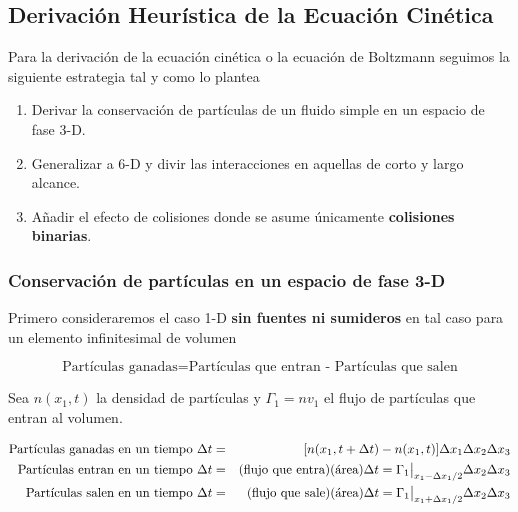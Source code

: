 \subsection{Derivaci\'on Heur\'istica de la Ecuaci\'on Cin\'etica}

Para la derivaci\'on de la ecuaci\'on cin\'etica o la ecuaci\'on de Boltzmann seguimos la siguiente estrategia tal y como lo plantea \cite{freidberg2014}

\begin{enumerate}
  \item Derivar la conservaci\'on de part\'iculas de un fluido simple en un espacio de fase 3-D.
  \item Generalizar a 6-D y divir las interacciones en aquellas de corto y largo alcance.
  \item A\~nadir el efecto de colisiones donde se asume \'unicamente \textbf{colisiones binarias}.
\end{enumerate} 

\subsubsection{Conservaci\'on de part\'iculas en un espacio de fase 3-D}

Primero consideraremos el caso 1-D \textbf{sin fuentes ni sumideros} en tal caso para un elemento infinitesimal de volumen 

\begin{equation*}
\text{Part\'iculas ganadas} = \text{Part\'iculas que entran - Part\'iculas que salen}
\end{equation*}

Sea $n(x_1, t)$ la densidad de part\'iculas y $\Gamma_{1} = nv_{1}$ el flujo de part\'iculas que entran al volumen.  

\begin{eqnarray}
  \text{Part\'iculas ganadas en un tiempo }  \Delta t &=& [n(x_1, t + \Delta t) - n(x_1,t)]\Delta x_1\Delta x_2\Delta x_3 \nonumber \\
  \text{Part\'iculas entran en un tiempo } \Delta t &=& (\text{flujo que entra})(\text{\'area})\Delta t = \Gamma_{1}\big{|}_{x_1 - \Delta x_1/2} \Delta x_2\Delta x_3 \nonumber\\
  \text{Part\'iculas salen en un tiempo } \Delta t &=& (\text{flujo que sale})(\text{\'area})\Delta t = \Gamma_{1}\big{|}_{x_1 + \Delta x_1/2}\Delta x_2\Delta x_3 \nonumber
\end{eqnarray}

